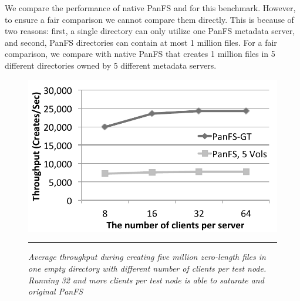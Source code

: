 We compare the performance of native PanFS and \psys for this benchmark.
However, to ensure a fair comparison we cannot compare them directly. This is
because of two reasons: first, a single directory can only utilize one PanFS 
metadata server, and second, PanFS directories can contain at most 1 million 
files.
For a fair comparison, we compare \psys with native PanFS that creates 1 million 
files in 5 different directories owned by 5 different metadata servers.

\begin{figure}[t]  %
\centerline{\includegraphics[scale=0.7]{./figs/zero_file_creation_on_panfs}}
\vspace{10pt}
\caption{\footnotesize
\textit{Average throughput during creating five million zero-length files
in one empty directory with different number of clients per test node.
Running 32 and more clients per test node is able to saturate \psys
and original PanFS}
}
\hrule
\label{graph:creation_clients}
\end{figure}       %

